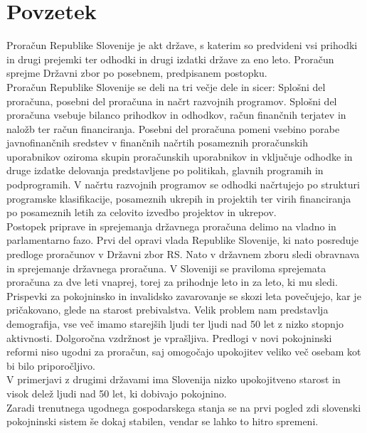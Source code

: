\documentclass[12pt, a4paper]{article}
\begin{document}
\section*{Povzetek}
\hspace*{5mm} Proračun Republike Slovenije je akt države, s katerim so predvideni vsi prihodki in drugi prejemki ter odhodki in drugi izdatki države za eno leto. Proračun sprejme Državni zbor po posebnem, predpisanem postopku. \\
\hspace*{5mm} Proračun Republike Slovenije se deli na tri večje dele in sicer: Splošni del proračuna, posebni del proračuna in načrt razvojnih programov. Splošni del proračuna vsebuje bilanco prihodkov in odhodkov, račun finančnih terjatev in naložb ter račun financiranja. Posebni del proračuna pomeni vsebino porabe javnofinančnih sredstev v finančnih načrtih posameznih proračunskih uporabnikov oziroma skupin proračunskih uporabnikov in vključuje odhodke in druge izdatke delovanja predstavljene po politikah, glavnih programih in podprogramih.  V načrtu razvojnih programov se odhodki načrtujejo po strukturi programske klasifikacije, posameznih ukrepih in projektih ter virih financiranja po posameznih letih za celovito izvedbo projektov in ukrepov. \\
\hspace*{5mm} Postopek priprave in sprejemanja državnega proračuna delimo na vladno in parlamentarno fazo. Prvi del opravi vlada Republike Slovenije, ki nato posreduje predloge proračunov v Državni zbor RS. Nato v državnem zboru sledi obravnava in sprejemanje državnega proračuna. V Sloveniji se praviloma sprejemata proračuna za dve leti vnaprej, torej za prihodnje leto in za leto, ki mu sledi. \\
\hspace*{5mm} Prispevki za pokojninsko in invalidsko zavarovanje se skozi leta povečujejo, kar je pričakovano, glede na starost prebivalstva. Velik problem nam predstavlja demografija, vse več imamo starejših ljudi ter ljudi nad 50 let z nizko stopnjo aktivnosti. Dolgoročna vzdržnost je vprašljiva. Predlogi v novi pokojninski reformi niso ugodni za proračun, saj omogočajo upokojitev veliko več osebam kot bi bilo priporočljivo. \\
\hspace*{5mm} V primerjavi z drugimi državami ima Slovenija nizko upokojitveno starost in visok delež ljudi nad 50 let, ki dobivajo pokojnino.\\
\hspace*{5mm} Zaradi trenutnega ugodnega gospodarskega stanja se na prvi pogled zdi slovenski pokojninski sistem še dokaj stabilen, vendar se lahko to hitro spremeni.
\end{document}
